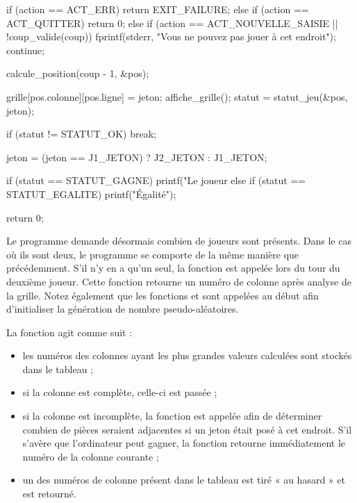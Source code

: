\begin{C}
{{{            if (action == ACT_ERR)
                return EXIT_FAILURE;
            else if (action == ACT_QUITTER)
                return 0;
            else if (action == ACT_NOUVELLE_SAISIE || !coup_valide(coup))
            {
                fprintf(stderr, "Vous ne pouvez pas jouer à cet endroit\n");
                continue;
            }

            calcule_position(coup - 1, &pos);
        }

        grille[pos.colonne][pos.ligne] = jeton;
        affiche_grille();
        statut = statut_jeu(&pos, jeton);

        if (statut != STATUT_OK)
            break;

        jeton = (jeton == J1_JETON) ? J2_JETON : J1_JETON;    
    }

    if (statut == STATUT_GAGNE)
        printf("Le joueur %
    else if (statut == STATUT_EGALITE)
        printf("Égalité\n");

    return 0;
}
\end{C}

Le programme demande désormais combien de joueurs sont présents. Dans le
cas où ils sont deux, le programme se comporte de la même manière que
précédemment. S'il n'y en a qu'un seul, la fonction  est
appelée lors du tour du deuxième joueur. Cette fonction retourne un
numéro de colonne après analyse de la grille. Notez également que les
fonctions  et  sont appelées au début
afin d'initialiser la génération de nombre pseudo-aléatoires.

La fonction  agit comme suit :

\begin{itemize}
\item
  les numéros des colonnes ayant les plus grandes valeurs calculées sont
  stockés dans le tableau  ;
\item
  si la colonne est complète, celle-ci est passée ;
\item
  si la colonne est incomplète, la fonction
   est appelée afin de déterminer
  combien de pièces seraient adjacentes si un jeton était posé à cet
  endroit. S'il s'avère que l'ordinateur peut gagner, la fonction
  retourne immédiatement le numéro de la colonne courante ;
\item
  un des numéros de colonne présent dans le tableau
   est tiré « au hasard » et est retourné.
\end{itemize}

